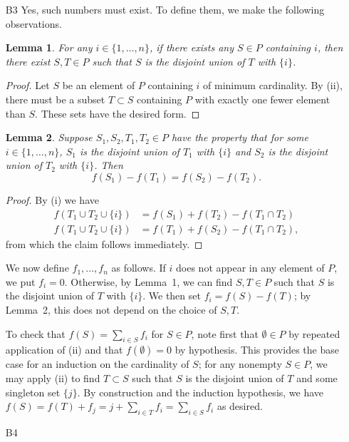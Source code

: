 \documentclass[amssymb,twocolumn,pra,10pt,aps]{revtex4-1}
\newtheorem{lemma}{Lemma}
\begin{document}
\begin{itemize}
\item[B3]
Yes, such numbers must exist. To define them, we make the following observations.

\setcounter{lemma}{0}
\begin{lemma}
For any $i \in \{1,\dots,n\}$, if there exists any $S \in P$ containing $i$, then there exist $S,T \in P$ such that $S$ is the disjoint union of $T$ with $\{i\}$.
\end{lemma}
\begin{proof}
Let $S$ be an element of $P$ containing $i$ of minimum cardinality.
By (ii), there must be a subset $T \subset S$ containing $P$ with exactly one fewer element than $S$. These sets have the desired form.
\end{proof}

\begin{lemma}
Suppose $S_1, S_2, T_1, T_2 \in P$ have the property that for some $i \in \{1,\dots,n\}$, $S_1$ is the disjoint union of $T_1$ with $\{i\}$ and $S_2$ is the disjoint union of $T_2$ with $\{i\}$. Then 
\[
f(S_1) - f(T_1) = f(S_2) - f(T_2).
\]
\end{lemma}
\begin{proof}
By (i) we have
\begin{align*}
f(T_1 \cup T_2 \cup \{i\}) &= f(S_1) + f(T_2) - f(T_1 \cap T_2) \\
f(T_1 \cup T_2 \cup \{i\}) &= f(T_1) + f(S_2) - f(T_1 \cap T_2),
\end{align*}
from which the claim follows immediately.
\end{proof}

We now define $f_1,\dots,f_n$ as follows. If $i$ does not appear in any element of $P$, we put $f_i = 0$. Otherwise, by Lemma~1, we can find 
$S, T \in P$ such that $S$ is the disjoint union of $T$ with $\{i\}$. We then set $f_i = f(S) - f(T)$; by Lemma~2, this does not depend on the choice of $S,T$.

To check that $f(S) = \sum_{i \in S} f_i$ for $S \in P$, note first that $\emptyset \in P$ by repeated application of (ii) and that $f(\emptyset) = 0$ by hypothesis. This provides the base case for an induction on the cardinality of $S$; for any nonempty $S \in P$, we may apply (ii) to find $T \subset S$ such that $S$ is the disjoint union of $T$ and some singleton set $\{j\}$. By construction and the induction hypothesis, we have $f(S) = f(T) + f_j = j + \sum_{i \in T} f_i = \sum_{i \in S} f_i$ as desired.

\item[B4]
\newcommand{\Var}{\mathrm{Var}}


\end{itemize}
\end{document}
